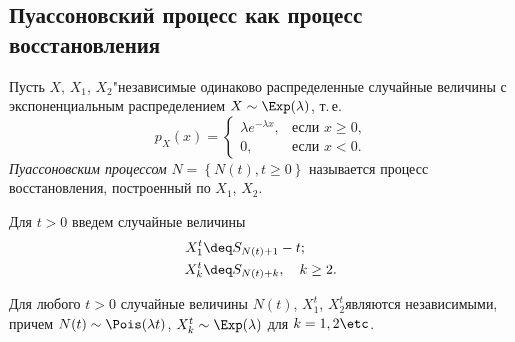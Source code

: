 \subsection{Пуассоновский процесс как процесс восстановления}

\begin{df}
	\sloppy
	Пусть $X$, $X_1$, $X_2$\etc	"\td независимые одинаково распределенные случайные величины с экспоненциальным распределением $X\sim \Exp(\lambda)$, т.\,е.
	$$
		p_X(x) =
		\begin{cases}
			\lambda e^{- \lambda x}, &\text{если $x \ge 0$,}\\
			0, &\text{если $x < 0$}.
		\end{cases}
	$$
	\textit{Пуассоновским процессом} $N = \left\{N(t), t\ge 0\right\}$ называется процесс восстановления, построенный по $X_1$, $X_2$\etc.
\end{df}

Для $t > 0$ введем случайные величины
\begin{align*}
	X_1^t &\deq S_{N(t) + 1} - t;\\
	X_k^t &\deq S_{N(t) + k},\quad k \ge 2.
\end{align*}

\begin{lemma}
	\sloppy
	Для любого $t > 0$ случайные величины $N(t)$, $X_1^t$, $X_2^t$\etc являются независимыми, причем $N(t) \sim \Pois(\lambda t)$, $X_k^t \sim \Exp(\lambda)$ для $k = 1, 2\etc$.
\end{lemma}


